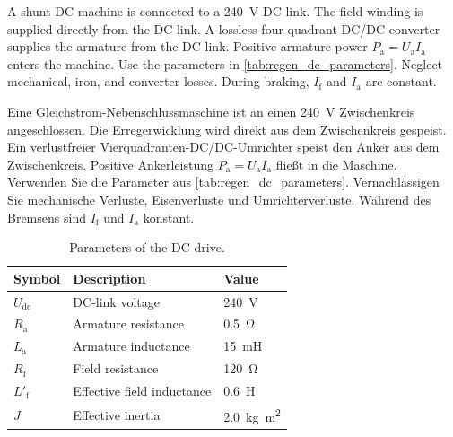 

A shunt DC machine is connected to a \SI{240}{\volt} DC link. The field winding is supplied directly from the DC link. A lossless four-quadrant DC/DC converter supplies the armature from the DC link. Positive armature power $P_{\mathrm{a}}=U_{\mathrm{a}}I_{\mathrm{a}}$ enters the machine. Use the parameters in \autoref{tab:regen_dc_parameters}. Neglect mechanical, iron, and converter losses. During braking, $I_{\mathrm{f}}$ and $I_{\mathrm{a}}$ are constant.

\begin{germanblock}
	Eine Gleichstrom-Nebenschlussmaschine ist an einen \SI{240}{\volt} Zwischenkreis angeschlossen. Die Erregerwicklung wird direkt aus dem Zwischenkreis gespeist. Ein verlustfreier Vierquadranten-DC/DC-Umrichter speist den Anker aus dem Zwischenkreis. Positive Ankerleistung $P_{\mathrm{a}}=U_{\mathrm{a}}I_{\mathrm{a}}$ fließt in die Maschine. Verwenden Sie die Parameter aus \autoref{tab:regen_dc_parameters}. Vernachlässigen Sie mechanische Verluste, Eisenverluste und Umrichterverluste. Während des Bremsens sind $I_{\mathrm{f}}$ und $I_{\mathrm{a}}$ konstant.
\end{germanblock}

\begin{table}[htb]
	\caption{Parameters of the DC drive.}
	\centering
	\begin{tabular}{lll}
		\toprule
		Symbol            & Description                & Value                             \\
		\midrule
		$U_{\mathrm{dc}}$ & DC-link voltage            & \SI{240}{\volt}                   \\
		$R_{\mathrm{a}}$  & Armature resistance        & \SI{0.5}{\ohm}                    \\
		$L_{\mathrm{a}}$  & Armature inductance        & \SI{15}{\milli\henry}             \\
		$R_{\mathrm{f}}$  & Field resistance           & \SI{120}{\ohm}                    \\
		$L'_{\mathrm{f}}$ & Effective field inductance & \SI{0.6}{\henry}                  \\
		$J$               & Effective inertia          & \SI{2.0}{\kilogram\metre\squared} \\
		\bottomrule
	\end{tabular}
	\label{tab:regen_dc_parameters}
\end{table}

